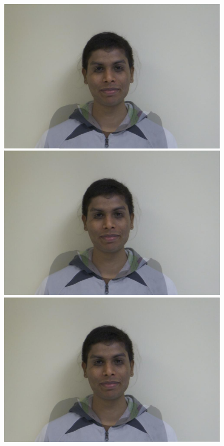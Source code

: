 \documentclass[11pt]{article}
\begin{document}
\begin{figure}[H]
\begin{center}
\includegraphics[scale=0.06]{figs/frames/morph_steinkirch_tangatur_40.jpg} 
\includegraphics[scale=0.06]{figs/frames/morph_steinkirch_tangatur_41.jpg} 
\includegraphics[scale=0.06]{figs/frames/morph_steinkirch_tangatur_42.jpg} 

\end{center}
\end{figure}
\end{document}
